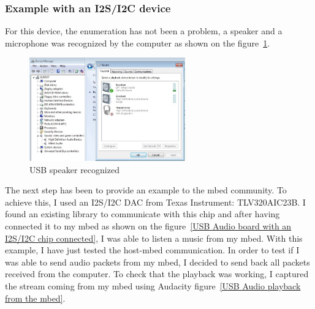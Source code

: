 \documentclass[pdftex,10pt,a4paper]{report}
\begin{document}
\subsubsection{Example with an I2S/I2C device}
For this device, the enumeration has not been a problem, a speaker and a microphone was recognized by the computer as shown on the figure~\ref{USB speaker recognized}.

\begin{figure}[h!]
		\centering
		\includegraphics[width=0.6\textwidth]{./mbed_audio.jpg}
		\caption{USB speaker recognized}
		\label{USB speaker recognized}
\end{figure}

The next step has been to provide an example to the mbed community. To achieve this, I used an I2S/I2C DAC from Texas Instrument: TLV320AIC23B. I found an existing library to communicate with this chip and after having connected it to my mbed as shown on the figure~\ref{USB Audio board with an I2S/I2C chip connected}, I was able to listen a music from my mbed. 
With this example, I have just tested the host-mbed communication. In order to test if I was able to send audio packets from my mbed, I decided to send back all packets received from the computer. To check that the playback was working, I captured the stream coming from my mbed using Audacity figure~\ref{USB Audio playback from the mbed}.
\end{document}
